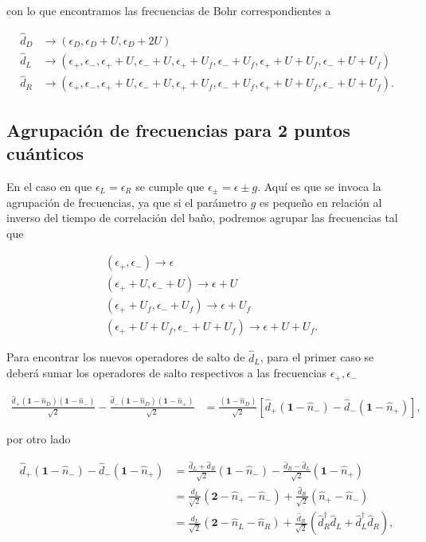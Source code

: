 \begin{appendixs}
con lo que encontramos las frecuencias de Bohr correspondientes a

\begin{align*}
    \hat{d}_{D} & \to (\epsilon_{D}, \epsilon_{D}+U,\epsilon_{D}+2U) \\
    \hat{d}_{L} & \to (\epsilon_{+},\epsilon_{-},\epsilon_{+}+U,\epsilon_{-}+U,\epsilon_{+}+U_{f},\epsilon_{-}+U_{f},\epsilon_{+}+U+U_{f},\epsilon_{-}+U+U_{f}) \\
    \hat{d}_{R} & \to (\epsilon_{+},\epsilon_{-},\epsilon_{+}+U,\epsilon_{-}+U,\epsilon_{+}+U_{f},\epsilon_{-}+U_{f},\epsilon_{+}+U+U_{f},\epsilon_{-}+U+U_{f}).
\end{align*}

\label{apendix5jumpop}

\subsection{Agrupación de frecuencias para 2 puntos cuánticos}
En el caso en que $\epsilon_{L} = \epsilon_{R}$ se cumple que $\epsilon_{\pm} = \epsilon \pm g$. Aquí es que se invoca la agrupación de frecuencias, ya que si el parámetro $g$ es pequeño en relación al inverso del tiempo de correlación del baño, podremos agrupar las frecuencias tal que

\begin{align*}
    &(\epsilon_{+},\epsilon_{-})  \to \epsilon \\
    &(\epsilon_{+}+U,\epsilon_{-}+U)  \to \epsilon+U \\
    &(\epsilon_{+}+U_{f},\epsilon_{-}+U_{f})  \to \epsilon+U_{f} \\
    &(\epsilon_{+}+U+U_{f},\epsilon_{-}+U+U_{f})  \to \epsilon+U+U_{f}.
\end{align*}

Para encontrar los nuevos operadores de salto de $\hat{d}_{L}$, para el primer caso se deberá sumar los operadores de salto respectivos a las frecuencias $\epsilon_{+},\epsilon_{-}$ 

\begin{align*}
    \frac{\hat{d}_{+}(\textbf{1}-\hat{n}_{D})(\textbf{1}-\hat{n}_{-})}{\sqrt{2}} - \frac{\hat{d}_{-}(\textbf{1}-\hat{n}_{D})(\textbf{1}-\hat{n}_{+})}{\sqrt{2}} & = \frac{(\textbf{1}-\hat{n}_{D})}{\sqrt{2}} [\hat{d}_{+}(\textbf{1}-\hat{n}_{-}) - \hat{d}_{-}(\textbf{1}-\hat{n}_{+}) ],
\end{align*}

por otro lado

\begin{align*}
    \hat{d}_{+}(\textbf{1}-\hat{n}_{-}) - \hat{d}_{-}(\textbf{1}-\hat{n}_{+}) & = \frac{\hat{d}_{L} + \hat{d}_{R}}{\sqrt{2}} (\textbf{1} - \hat{n}_{-}) - \frac{\hat{d}_{R} - \hat{d}_{L}}{\sqrt{2}}(\textbf{1}-\hat{n}_{+}) \\
    & = \frac{\hat{d}_{L}}{\sqrt{2}}(\textbf{2} - \hat{n}_{+} -\hat{n}_{-} ) + \frac{\hat{d}_{R}}{\sqrt{2}}(\hat{n}_{+} -\hat{n}_{-}) \\
    & = \frac{\hat{d}_{L}}{\sqrt{2}}(\textbf{2}-\hat{n}_{L} -\hat{n}_{R}) + \frac{\hat{d}_{R}}{\sqrt{2}}(\hat{d}^{\dagger}_{R}\hat{d}_{L}+\hat{d}^{\dagger}_{L}\hat{d}_{R}),
\end{align*}


\end{appendixs}
